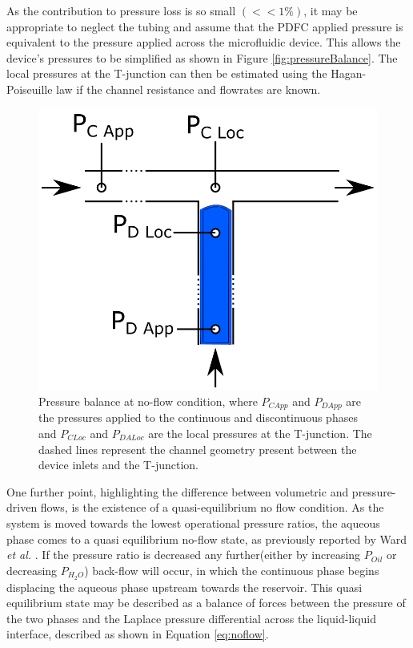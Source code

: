 As the contribution to pressure loss is so small $(<< 1 \%)$, it may be appropriate to neglect the tubing and assume that the PDFC applied pressure is equivalent to the pressure applied across the microfluidic device. This allows the device's pressures to be simplified as shown in Figure \vref{fig:pressureBalance}. The local pressures at the T-junction can then be estimated using the Hagan-Poiseuille law if the channel resistance and flowrates are known.

\begin{figure}[H]
\centering 
\includegraphics[width=0.75\columnwidth]{pressureBalance.PNG} 
\caption[Pressure Balance at no-flow condition.]{Pressure balance at no-flow condition, where $P_{C App}$ and $P_{D App}$ are the pressures applied to the continuous and discontinuous phases and $P_{C Loc}$ and $P_{D ALoc}$ are the local pressures at the T-junction. The dashed lines represent the channel geometry present between the device inlets and the T-junction.} 
\label{fig:pressureBalance} 
\end{figure}

One further point, highlighting the difference between volumetric and pressure-driven flows, is the existence of a quasi-equilibrium no flow condition. As the system is moved towards the lowest operational pressure ratios, the aqueous phase comes to a quasi equilibrium no-flow state, as previously reported by Ward \emph{et al.} \cite{Ward2005}. If the pressure ratio is decreased any further(either by increasing $P_{Oil}$ or decreasing $P_{H_2O}$) back-flow will occur, in which the continuous phase begins displacing the aqueous phase upstream towards the reservoir. This quasi equilibrium state may be described as a balance of forces between the pressure of the two phases and the Laplace pressure differential across the liquid-liquid interface, described as shown in Equation \vref{eq:noflow}.

